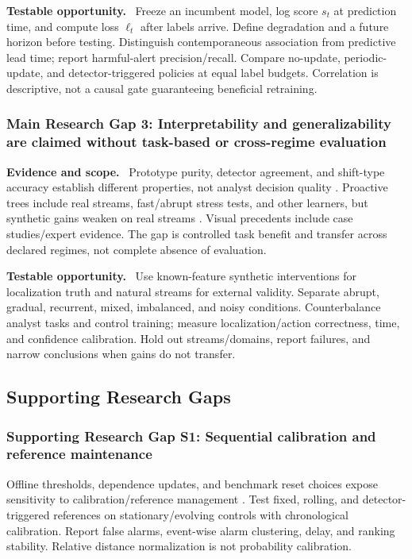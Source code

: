 \documentclass[10pt,a4paper]{article}
\newcommand{\lead}[1]{\textbf{#1}\ }
\begin{document}
\lead{Testable opportunity.}
Freeze an incumbent model, log score $s_t$ at prediction time, and compute loss $\ell_t$ after labels arrive. Define degradation and a future horizon before testing. Distinguish contemporaneous association from predictive lead time; report harmful-alert precision/recall. Compare no-update, periodic-update, and detector-triggered policies at equal label budgets. Correlation is descriptive, not a causal gate guaranteeing beneficial retraining.

\subsubsection*{Main Research Gap 3: Interpretability and generalizability are claimed without task-based or cross-regime evaluation}
\lead{Evidence and scope.}
Prototype purity, detector agreement, and shift-type accuracy establish different properties, not analyst decision quality \cite{greco,szucs,roschewitz}. Proactive trees include real streams, fast/abrupt stress tests, and other learners, but synthetic gains weaken on real streams \cite{guerrero}. Visual precedents include case studies/expert evidence. The gap is controlled task benefit and transfer across declared regimes, not complete absence of evaluation.

\lead{Testable opportunity.}
Use known-feature synthetic interventions for localization truth and natural streams for external validity. Separate abrupt, gradual, recurrent, mixed, imbalanced, and noisy conditions. Counterbalance analyst tasks and control training; measure localization/action correctness, time, and confidence calibration. Hold out streams/domains, report failures, and narrow conclusions when gains do not transfer.

\subsection{Supporting Research Gaps}
\subsubsection*{Supporting Research Gap S1: Sequential calibration and reference maintenance}
Offline thresholds, dependence updates, and benchmark reset choices expose sensitivity to calibration/reference management \cite{greco,szucs,lukats}. Test fixed, rolling, and detector-triggered references on stationary/evolving controls with chronological calibration. Report false alarms, event-wise alarm clustering, delay, and ranking stability. Relative distance normalization is not probability calibration.
\end{document}
